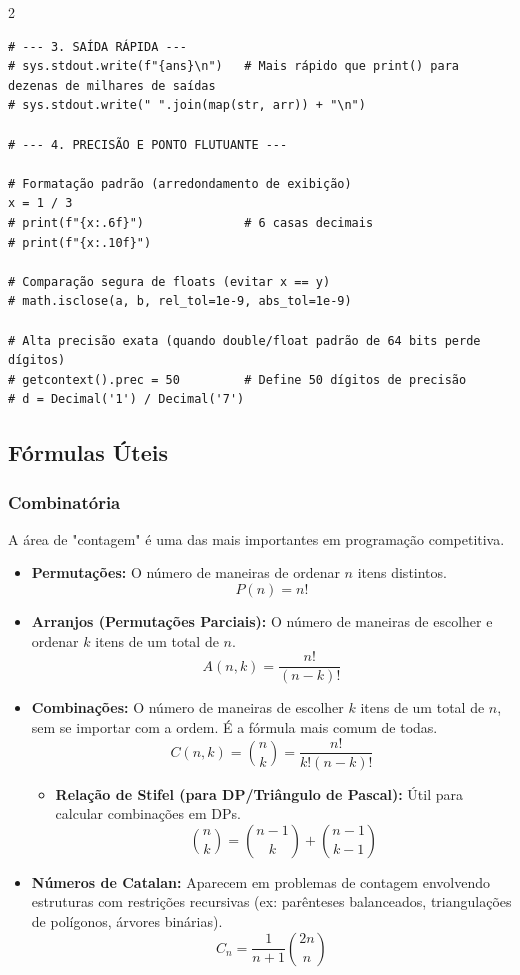 \documentclass[11pt]{article}
\begin{document}
\begin{multicols}{2}
\begin{lstlisting}
# --- 3. SAÍDA RÁPIDA ---
# sys.stdout.write(f"{ans}\n")   # Mais rápido que print() para dezenas de milhares de saídas
# sys.stdout.write(" ".join(map(str, arr)) + "\n")

# --- 4. PRECISÃO E PONTO FLUTUANTE ---

# Formatação padrão (arredondamento de exibição)
x = 1 / 3
# print(f"{x:.6f}")              # 6 casas decimais
# print(f"{x:.10f}")

# Comparação segura de floats (evitar x == y)
# math.isclose(a, b, rel_tol=1e-9, abs_tol=1e-9)

# Alta precisão exata (quando double/float padrão de 64 bits perde dígitos)
# getcontext().prec = 50         # Define 50 dígitos de precisão
# d = Decimal('1') / Decimal('7')
\end{lstlisting}

\subsection{Fórmulas Úteis}

\subsubsection{Combinatória}

A área de "contagem" é uma das mais importantes em programação competitiva.

\begin{itemize}
    \item \textbf{Permutações:} O número de maneiras de ordenar $n$ itens distintos.
    \[ P(n) = n! \]
    
    \item \textbf{Arranjos (Permutações Parciais):} O número de maneiras de escolher e ordenar $k$ itens de um total de $n$.
    \[ A(n, k) = \frac{n!}{(n-k)!} \]
    
    \item \textbf{Combinações:} O número de maneiras de escolher $k$ itens de um total de $n$, sem se importar com a ordem. É a fórmula mais comum de todas.
    \[ C(n, k) = \binom{n}{k} = \frac{n!}{k!(n-k)!} \]
    \begin{itemize}
        \item \textbf{Relação de Stifel (para DP/Triângulo de Pascal):} Útil para calcular combinações em DPs.
        \[ \binom{n}{k} = \binom{n-1}{k} + \binom{n-1}{k-1} \]
    \end{itemize}
    
    \item \textbf{Números de Catalan:} Aparecem em problemas de contagem envolvendo estruturas com restrições recursivas (ex: parênteses balanceados, triangulações de polígonos, árvores binárias).
    \[ C_n = \frac{1}{n+1}\binom{2n}{n} \]
    

\end{itemize}
\end{multicols}
\end{document}
